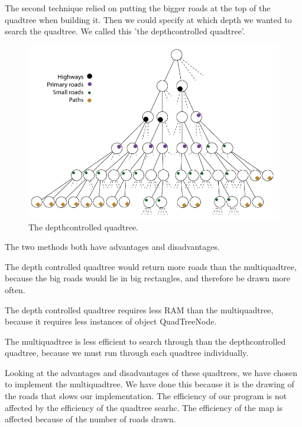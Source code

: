 The second technique relied on putting the bigger roads at the top of the
quadtree when building it. Then we could specify at which depth we wanted to
search the quadtree. We called this 'the depthcontrolled quadtree'.

\begin{figure}[h!]
\centering
\includegraphics[width=1\linewidth]{images/DepthcontrolledQuadtree.png}
\caption{The depthcontrolled quadtree.}
\label{IMPL-DCQ}
\end{figure}

The two methods both have advantages and disadvantages.

The depth controlled quadtree would return more roads than the multiquadtree,
because the big roads would lie in big rectangles, and therefore be drawn more
often. 

The depth controlled quadtree requires less RAM than the multiquadtree, 
because it requires less instances of object QuadTreeNode.

The multiquadtree is less efficient to search through than the
depthcontrolled quadtree, because we must run through each quadtree
individually.

Looking at the advantages and disadvantages of these quadtrees, we have chosen
to implement the multiquadtree. We have done this because it is the drawing of
the roads that slows our implementation. The efficiency of our program is not
affected by the efficiency of the quadtree searhc. The efficiency of the map is
affected because of the number of roads drawn.

